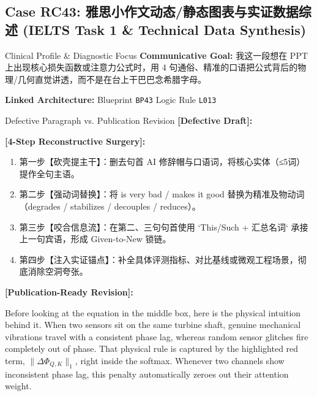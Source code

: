 \subsection{Case RC43: 雅思小作文动态/静态图表与实证数据综述 (IELTS Task 1 \& Technical Data Synthesis)}\label{case:RC43}
\begin{ConceptBox}{Clinical Profile \& Diagnostic Focus}
\textbf{Communicative Goal:} 我这一段想在 PPT 上出现核心损失函数或注意力公式时，用 4 句通俗、精准的口语把公式背后的物理/几何直觉讲透，而不是在台上干巴巴念希腊字母。\par
\textbf{Linked Architecture:} Blueprint \texttt{BP43} \enspace\textbar\enspace Logic Rule \texttt{L013}
\end{ConceptBox}
\begin{ExampleBox}{Defective Paragraph vs. Publication Revision}
\textbf{\color{TargetHighlight}[Defective Draft]:}\par
{}\par\vspace{6pt}
\textbf{\color{AcadForest}[4-Step Reconstructive Surgery]:}
\begin{enumerate}[label=\textbf{\color{AcadNavy}Step \arabic*:}, leftmargin=2em]
  \item 第一步【砍壳提主干】：删去句首 AI 修辞帽与口语词，将核心实体（≤5词）提作全句主语。
  \item 第二步【强动词替换】：将 is very bad / makes it good 替换为精准及物动词（degrades / stabilizes / decouples / reduces）。
  \item 第三步【咬合信息流】：在第二、三句句首使用 `This/Such + 汇总名词` 承接上一句宾语，形成 Given-to-New 锁链。
  \item 第四步【注入实证锚点】：补全具体评测指标、对比基线或微观工程场景，彻底消除空洞夸张。
\end{enumerate}\vspace{4pt}
\textbf{\color{AcadNavy}[Publication-Ready Revision]:}\par
Before looking at the equation in the middle box, here is the physical intuition behind it. When two sensors sit on the same turbine shaft, genuine mechanical vibrations travel with a consistent phase lag, whereas random sensor glitches fire completely out of phase. That physical rule is captured by the highlighted red term, $\|\Delta \Phi_{Q,K}\|_1$, right inside the softmax. Whenever two channels show inconsistent phase lag, this penalty automatically zeroes out their attention weight.
\end{ExampleBox}
